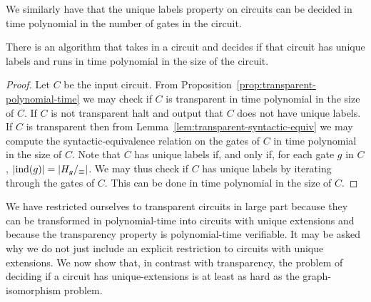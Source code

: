 \documentclass[../paper.tex]{subfiles}
\begin{document}
We similarly have that the unique labels property on circuits can be decided in
time polynomial in the number of gates in the circuit.

\begin{cor}
  There is an algorithm that takes in a circuit and decides if that circuit has
  unique labels and runs in time polynomial in the size of the circuit.
\end{cor}
\begin{proof}
  Let $C$ be the input circuit. From
  Proposition~\ref{prop:transparent-polynomial-time} we may check if $C$ is
  transparent in time polynomial in the size of $C$. If $C$ is not transparent
  halt and output that $C$ does not have unique labels. If $C$ is transparent
  then from Lemma~\ref{lem:transparent-syntactic-equiv} we may compute the
  syntactic-equivalence relation on the gates of $C$ in time polynomial in the
  size of $C$. Note that $C$ has unique labels if, and only if, for each gate
  $g$ in $C$, $\vert \text{\upshape ind}(g) \vert = \vert H_g /_\equiv \vert$. We may thus
  check if $C$ has unique labels by iterating through the gates of $C$. This can
  be done in time polynomial in the size of $C$.
\end{proof}


We have restricted ourselves to transparent circuits in large part because they
can be transformed in polynomial-time into circuits with unique extensions and
because the transparency property is polynomial-time verifiable. It may be asked
why we do not just include an explicit restriction to circuits with unique
extensions. We now show that, in contrast with transparency, the problem of
deciding if a circuit has unique-extensions is at least as hard as the
graph-isomorphism problem.
\end{document}
